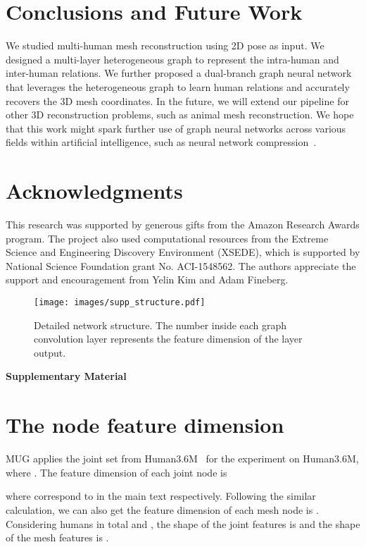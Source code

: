 \documentclass[runningheads]{llncs}
\begin{document}
\section{Conclusions and Future Work}
We studied multi-human mesh reconstruction using 2D pose as input. 
We designed a multi-layer heterogeneous graph to represent the intra-human and inter-human relations. 
We further proposed a dual-branch graph neural network that leverages the heterogeneous graph to learn human relations and accurately recovers the 3D mesh coordinates. 
In the future, we will extend our pipeline for other 3D reconstruction problems, such as animal mesh reconstruction.
We hope that this work might spark further use of graph neural networks across various fields within artificial intelligence, such as neural network compression~\cite{Xu_2019_CVPR}.

\section*{Acknowledgments}

This research was supported by generous gifts from the Amazon Research Awards program. The project also used computational resources from the Extreme Science and Engineering Discovery Environment (XSEDE), which is supported by National Science Foundation grant No. ACI-1548562. The authors appreciate the support and encouragement from Yelin Kim and Adam Fineberg.





\clearpage
\appendix
\setcounter{figure}{0} 
\setcounter{table}{0} 
\setcounter{equation}{0} 
\begin{figure*}[h!]
  \centering
  {\texttt{[image: images/supp\_structure.pdf]}}
\caption{Detailed network structure. The number inside each graph convolution layer represents the feature dimension of the layer output.} 
\label{fig:detail}
\end{figure*}



{\large\bf Supplementary Material
}
\section{The node feature dimension}
MUG applies the joint set from Human3.6M~\cite{ionescu2013human3} for the experiment on Human3.6M, where . The feature dimension of each joint node is 

where  correspond to  in the main text respectively. Following the similar calculation, we can also get the feature dimension of each mesh node is . Considering  humans in total and , the shape of the joint features is  and the shape of the mesh features is . 
\end{document}
